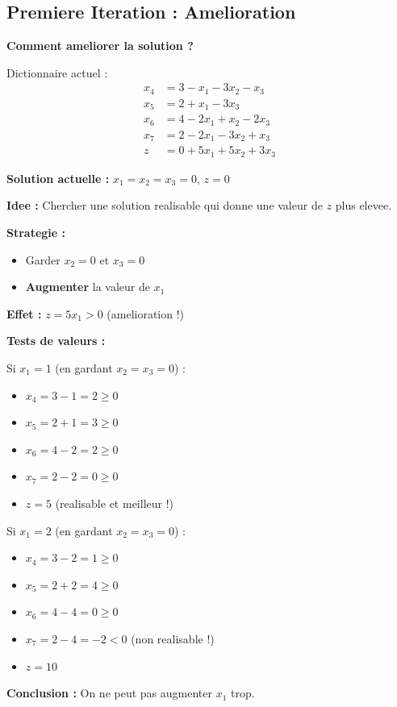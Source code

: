 \documentclass[12pt,a4paper]{article}
\begin{document}
\newpage
\subsection{Premiere Iteration : Amelioration}

\begin{methode}
\textbf{Comment ameliorer la solution ?}

Dictionnaire actuel :
\begin{align*}
x_4 &= 3 - x_1 - 3x_2 - x_3\\
x_5 &= 2 + x_1 - 3x_3\\
x_6 &= 4 - 2x_1 + x_2 - 2x_3\\
x_7 &= 2 - 2x_1 - 3x_2 + x_3\\
z &= 0 + 5x_1 + 5x_2 + 3x_3
\end{align*}

\textbf{Solution actuelle :} $x_1 = x_2 = x_3 = 0$, $z = 0$

\textbf{Idee :} Chercher une solution realisable qui donne une valeur de $z$ plus elevee.

\textbf{Strategie :}
\begin{itemize}
    \item Garder $x_2 = 0$ et $x_3 = 0$
    \item \textcolor{defvert}{\textbf{Augmenter}} la valeur de $x_1$
\end{itemize}

\textbf{Effet :} $z = 5x_1 > 0$ (amelioration !)
\end{methode}

\begin{exemple}
\textbf{Tests de valeurs :}

Si $x_1 = 1$ (en gardant $x_2 = x_3 = 0$) :
\begin{itemize}
    \item $x_4 = 3 - 1 = 2 \geq 0$ \checkmark
    \item $x_5 = 2 + 1 = 3 \geq 0$ \checkmark
    \item $x_6 = 4 - 2 = 2 \geq 0$ \checkmark
    \item $x_7 = 2 - 2 = 0 \geq 0$ \checkmark
    \item $z = 5$ \textcolor{defvert}{(realisable et meilleur !)}
\end{itemize}

Si $x_1 = 2$ (en gardant $x_2 = x_3 = 0$) :
\begin{itemize}
    \item $x_4 = 3 - 2 = 1 \geq 0$ \checkmark
    \item $x_5 = 2 + 2 = 4 \geq 0$ \checkmark
    \item $x_6 = 4 - 4 = 0 \geq 0$ \checkmark
    \item $x_7 = 2 - 4 = -2 < 0$ \textcolor{importantrouge}{ (non realisable !)}
    \item $z = 10$
\end{itemize}

\textbf{Conclusion :} On ne peut pas augmenter $x_1$ trop.
\end{exemple}
\end{document}
